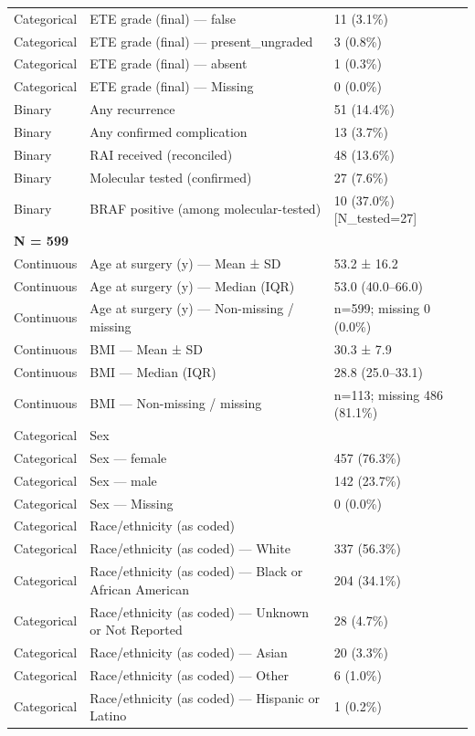 \begin{table}[htbp]
\begin{tabular}{lll}
Categorical & ETE grade (final) — false & 11 (3.1\%) \\
Categorical & ETE grade (final) — present\_ungraded & 3 (0.8\%) \\
Categorical & ETE grade (final) — absent & 1 (0.3\%) \\
Categorical & ETE grade (final) — Missing & 0 (0.0\%) \\
Binary & Any recurrence & 51 (14.4\%) \\
Binary & Any confirmed complication & 13 (3.7\%) \\
Binary & RAI received (reconciled) & 48 (13.6\%) \\
Binary & Molecular tested (confirmed) & 27 (7.6\%) \\
Binary & BRAF positive (among molecular-tested) & 10 (37.0\%) [N\_tested=27] \\
\multicolumn{3}{l}{\textbf{N = 599}} \\
Continuous & Age at surgery (y) — Mean ± SD & 53.2 ± 16.2 \\
Continuous & Age at surgery (y) — Median (IQR) & 53.0 (40.0–66.0) \\
Continuous & Age at surgery (y) — Non-missing / missing & n=599; missing 0 (0.0\%) \\
Continuous & BMI — Mean ± SD & 30.3 ± 7.9 \\
Continuous & BMI — Median (IQR) & 28.8 (25.0–33.1) \\
Continuous & BMI — Non-missing / missing & n=113; missing 486 (81.1\%) \\
Categorical & Sex &  \\
Categorical & Sex — female & 457 (76.3\%) \\
Categorical & Sex — male & 142 (23.7\%) \\
Categorical & Sex — Missing & 0 (0.0\%) \\
Categorical & Race/ethnicity (as coded) &  \\
Categorical & Race/ethnicity (as coded) — White & 337 (56.3\%) \\
Categorical & Race/ethnicity (as coded) — Black or African American & 204 (34.1\%) \\
Categorical & Race/ethnicity (as coded) — Unknown or Not Reported & 28 (4.7\%) \\
Categorical & Race/ethnicity (as coded) — Asian & 20 (3.3\%) \\
Categorical & Race/ethnicity (as coded) — Other & 6 (1.0\%) \\
Categorical & Race/ethnicity (as coded) — Hispanic or Latino & 1 (0.2\%) \\

\end{tabular}
\end{table}
